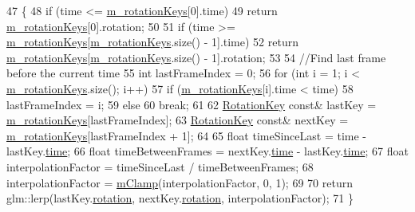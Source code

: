 \begin{DoxyCode}
47 \{
48   \textcolor{keywordflow}{if} (time <= \hyperlink{class_bone_key_sequence_abb6be9db9c5bdc089b6ae7ea6bdae0e3}{m\_rotationKeys}[0].time)
49     \textcolor{keywordflow}{return} \hyperlink{class_bone_key_sequence_abb6be9db9c5bdc089b6ae7ea6bdae0e3}{m\_rotationKeys}[0].rotation;
50 
51   \textcolor{keywordflow}{if} (time >= \hyperlink{class_bone_key_sequence_abb6be9db9c5bdc089b6ae7ea6bdae0e3}{m\_rotationKeys}[\hyperlink{class_bone_key_sequence_abb6be9db9c5bdc089b6ae7ea6bdae0e3}{m\_rotationKeys}.size() - 1].time)
52     \textcolor{keywordflow}{return} \hyperlink{class_bone_key_sequence_abb6be9db9c5bdc089b6ae7ea6bdae0e3}{m\_rotationKeys}[\hyperlink{class_bone_key_sequence_abb6be9db9c5bdc089b6ae7ea6bdae0e3}{m\_rotationKeys}.size() - 1].rotation;
53 
54   \textcolor{comment}{//Find last frame before the current time}
55   \textcolor{keywordtype}{int} lastFrameIndex = 0;
56   \textcolor{keywordflow}{for} (\textcolor{keywordtype}{int} i = 1; i < \hyperlink{class_bone_key_sequence_abb6be9db9c5bdc089b6ae7ea6bdae0e3}{m\_rotationKeys}.size(); i++)
57     \textcolor{keywordflow}{if} (\hyperlink{class_bone_key_sequence_abb6be9db9c5bdc089b6ae7ea6bdae0e3}{m\_rotationKeys}[i].time < time)
58       lastFrameIndex = i;
59     \textcolor{keywordflow}{else}
60       \textcolor{keywordflow}{break};
61 
62   \hyperlink{struct_rotation_key}{RotationKey} \textcolor{keyword}{const}& lastKey = \hyperlink{class_bone_key_sequence_abb6be9db9c5bdc089b6ae7ea6bdae0e3}{m\_rotationKeys}[lastFrameIndex];
63   \hyperlink{struct_rotation_key}{RotationKey} \textcolor{keyword}{const}& nextKey = \hyperlink{class_bone_key_sequence_abb6be9db9c5bdc089b6ae7ea6bdae0e3}{m\_rotationKeys}[lastFrameIndex + 1];
64 
65   \textcolor{keywordtype}{float} timeSinceLast = time - lastKey.\hyperlink{struct_rotation_key_a421ab28d247b062e4c46e4879943ee7d}{time};
66   \textcolor{keywordtype}{float} timeBetweenFrames = nextKey.\hyperlink{struct_rotation_key_a421ab28d247b062e4c46e4879943ee7d}{time} - lastKey.\hyperlink{struct_rotation_key_a421ab28d247b062e4c46e4879943ee7d}{time};
67   \textcolor{keywordtype}{float} interpolationFactor = timeSinceLast / timeBetweenFrames;
68   interpolationFactor = \hyperlink{_m_math_8h_a35bcf6994210feb2d96d1d22df3385ea}{mClamp}(interpolationFactor, 0, 1);
69 
70   \textcolor{keywordflow}{return} glm::lerp(lastKey.\hyperlink{struct_rotation_key_a9638fbf119b41fd844b3d24c9e95d52d}{rotation}, nextKey.\hyperlink{struct_rotation_key_a9638fbf119b41fd844b3d24c9e95d52d}{rotation}, interpolationFactor);
71 \}
\end{DoxyCode}


